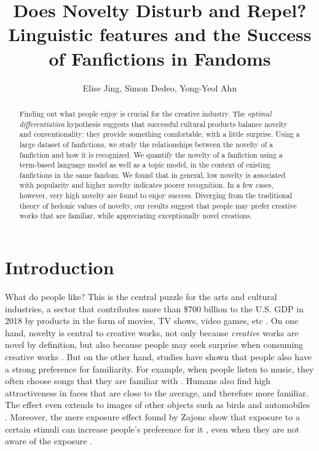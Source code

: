 \documentclass[letterpaper]{article} %
\begin{document}
%
\title{Does Novelty Disturb and Repel? Linguistic features and the Success of Fanfictions in Fandoms}
\author{Elise Jing, Simon Dedeo, Yong-Yeol Ahn\\
}
\maketitle
\begin{abstract}
Finding out what people enjoy is crucial for the creative industry. The \emph{optimal differentiation} hypothesis suggests that successful cultural products balance novelty and conventionality: they provide something comfortable, with a little surprise. Using a large dataset of fanfictions, we study the relationships between the   novelty of a fanfiction and how it is recognized. We quantify the novelty of a fanfiction using a term-based language model as well as a topic model, in the context of existing fanfictions in the same fandom. We found that in general, low novelty is associated with popularity and higher novelty indicates poorer recognition. In a few cases, however, very high novelty are found to enjoy success. Diverging from the traditional theory of hedonic values of novelty, our results suggest that people may prefer creative works that are familiar, while appreciating exceptionally novel creations.
\end{abstract}

\section*{Introduction}
\noindent 
What do people like? This is the central puzzle for the arts and cultural industries, a sector that contributes more than \$700 billion to the U.S. GDP in 2018 by products in the form of movies, TV shows, video games, etc \cite{artsculturalindustries}. On one hand, novelty is central to creative works, not only because \emph{creative} works are novel by definition, but also because people may seek surprise when consuming creative works \cite{hutter2011infinite}. But on the other hand, studies have shown that people also have a strong preference for familiarity. For example, when people listen to music, they often choose songs that they are familiar with \cite{thompson2014shazam}. Humans also find high attractiveness in faces that are close to the average, and therefore more familiar. 
The effect even extends to images of other objects such as birds and automobiles \cite{Halberstadt2003}. Moreover, the mere exposure effect found by Zajonc show that exposure to a certain stimuli can increase people's preference for it \cite{zajonc1968attitudinal}, even when they are not aware of the exposure \cite{kunst1980affective} \cite{bornstein1989exposure}. 
\end{document}
